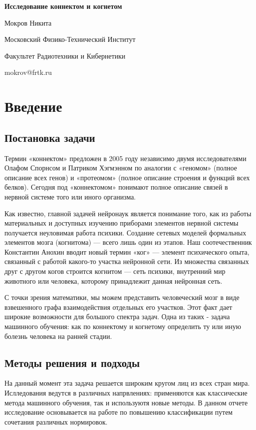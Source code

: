 \documentclass{urticle}
\begin{document}
\begin{center}
{\LARGE \textbf{Исследование коннектом и когнетом}}

{\Large Мокров Никита}

{\large Московский Физико-Технический Институт}

{\large Факультет Радиотехники и Кибернетики}

{\large mokrov@frtk.ru}
\end{center}

\section*{Введение}
\subsection*{Постановка задачи}
Термин «коннектом» предложен в 2005 году независимо двумя исследователями Олафом Спорнсом и Патриком Хэгмэнном по аналогии с «геномом» (полное описание всех генов) и «протеомом» (полное описание строения и функций всех белков). Сегодня под «коннектомом» понимают полное описание связей в нервной системе того или иного организма.

Как известно, главной задачей нейронаук является понимание того, как из работы материальных и доступных изучению приборами элементов нервной системы получается неуловимая работа психики. Создание сетевых моделей формальных элементов мозга (когнитома) — всего лишь один из этапов. Наш соотечественник Константин Анохин вводит новый термин «ког» — элемент психического опыта, связанный с работой какого-то участка нейронной сети. Из множества связанных друг с другом когов строится когнитом — сеть психики, внутренний мир животного или человека, которому принадлежит данная нейронная сеть.

С точки зрения математики, мы можем представить человеческий мозг в виде взвешенного графа взаимодействия отдельных его участков. Этот факт дает широкие возможности для большого спектра задач. Одна из таких - задача машинного обучения: как по коннектому и когнетому определить ту или иную болезнь человека на ранней стадии.

\subsection*{Методы решения и подходы}
На данный момент эта задача решается широким кругом лиц из всех стран мира. Ислледования ведутся в различных напрвлениях: применяются как классические метода машинного обучения, так и используютя новые методы. В данном отчете исследование основывается на работе по повышению классификации путем сочетания различных нормировок\cite{article1}. 
\end{document}
